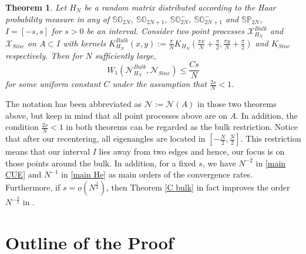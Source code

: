 \documentclass[11pt]{article}
\newtheorem{theorem}{Theorem}[section]
\numberwithin{equation}{section}%
\numberwithin{theorem}{section}
\begin{document}
\begin{theorem}\label{C2}
  Let $H_N$ be a random matrix distributed according to the Haar probability measure in any of $\mathbb{SO}_{2N},~\mathbb{SO}_{2N+1},~\mathbb{SO}^{-}_{2N},~\mathbb{SO}^-_{2N+1}$ and $\mathbb{SP}_{2N}$, $I=[-s,s]$ for $s>0$ be an interval.  Consider two point processes $\mathcal{X}_{H_N}^{Bulk}$ and $\mathcal{X}_{Sine}$ on $A\subset I$ with kernels $K_{H_N}^{Bulk}(x,y):=\frac{\pi}{N}K_{H_N}(\frac{\pi x}{N}+\frac{\pi}{2},\frac{\pi y}{N}+\frac{\pi}{2})$ and $K_{Sine}$ respectively. Then for $N$ sufficiently large,
\begin{equation}\label{main He}
W_1(\mathcal{N}_{H_N}^{Bulk},\mathcal{N}_{Sine})\le \frac{Cs}{N}
\end{equation}
for some uniform constant $C$ under the assumption that $\frac{2s}{N}<1$.
\end{theorem}
The notation has been abbreviated as $\mathcal{N}:=\mathcal{N}(A)$ in those two theorems above, but keep in mind that all point processes above are on $A$.
    In addition, the condition $\frac{2s}{N}<1$ in both theorems can be regarded as the bulk restriction. Notice that after our recentering, all eigenangles are located in $[-\frac{N}{2},\frac{N}{2}]$. This restriction means that our interval $I$ lies away from two edges and hence, our focus is on those points around the bulk. In addition, for a fixed $s$, we have $N^{-2}$ in \eqref{main CUE} and $N^{-1}$ in \eqref{main He} as main orders of the convergence rates. Furthermore, if $s=o\left(N^{\frac{1}{4}}\right)$, then Theorem \ref{C bulk} in fact improves the order $N^{-\frac{3}{2}}$ in \cite[Corollary $6$]{meckes2015self}.
\section{Outline of the Proof}
\end{document}
